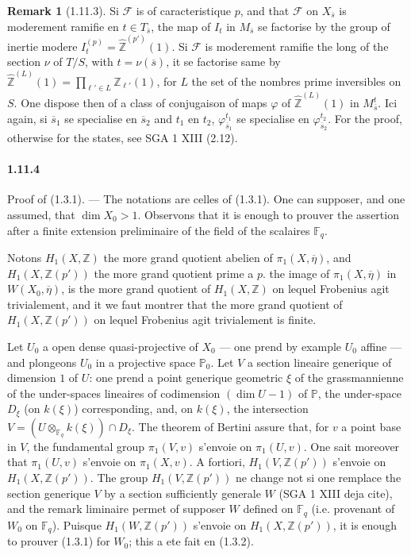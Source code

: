 \documentclass[12pt,a4paper]{article}
\theoremstyle{plain}
\theoremstyle{definition}
\newtheorem{remark}[theorem]{Remark}
\theoremstyle{remark}
\newcommand{\FF}{{\mathbb{F}}}
\newcommand{\ZZ}{{\mathbb{Z}}}
\newcommand{\ZZhat}{{\widehat{\ZZ}}}
\newcommand{\PP}{{\mathbb{P}}}
\begin{document}
\begin{remark}[1.11.3]
Si $\mathscr{F}$ is of caracteristique $p$, and that $\mathscr{F}$ on $X_{\overline{s}}$ is moderement ramifie en $t \in T_{\overline{s}}$, the map of $I_t$ in $M_{\overline{s}}$ se factorise by the group of inertie modere $I_t^{(p)} = \ZZhat^{(p')}(1)$. Si $\mathscr{F}$ is moderement ramifie the long of the section $\nu$ of $T/S$, with $t = \nu(\overline{s})$, it se factorise same by $\ZZhat^{(L)}(1) = \prod_{\ell' \in L} \ZZ_{\ell'}(1)$, for $L$ the set of the nombres prime inversibles on $S$. One dispose then of a class of conjugaison of maps $\varphi$ of $\ZZhat^{(L)}(1)$ in $M_{\overline{s}}^t$. Ici again, si $\overline{s}_1$ se specialise en $\overline{s}_2$ and $t_1$ en $t_2$, $\varphi_{\overline{s}_1}^{t_1}$ se specialise en $\varphi_{\overline{s}_2}^{t_2}$. For the proof, otherwise for the states, see SGA 1 XIII (2.12).
\end{remark}

\paragraph{1.11.4}
Proof of (1.3.1). --- The notations are celles of (1.3.1). One can supposer, and one assumed, that $\dim X_0 > 1$. Observons that it is enough to prouver the assertion after a finite extension preliminaire of the field of the scalaires $\FF_q$.

Notons $H_1(X, \ZZ)$ the more grand quotient abelien of $\pi_1(X, \overline{\eta})$, and $H_1(X, \ZZ(p'))$ the more grand quotient prime a $p$. the image of $\pi_1(X, \overline{\eta})$ in $W(X_0, \overline{\eta})$, is the more grand quotient of $H_1(X, \ZZ)$ on lequel Frobenius agit trivialement, and it we faut montrer that the more grand quotient of $H_1(X, \ZZ(p'))$ on lequel Frobenius agit trivialement is finite.

Let $U_0$ a open dense quasi-projective of $X_0$ --- one prend by example $U_0$ affine --- and plongeons $U_0$ in a projective space $\PP_0$. Let $V$ a section lineaire generique of dimension $1$ of $U$: one prend a point generique geometric $\xi$ of the grassmannienne of the under-spaces lineaires of codimension $(\dim U - 1)$ of $\PP$, the under-space $D_\xi$ (on $k(\xi)$) corresponding, and, on $k(\xi)$, the intersection $V = (U \otimes_{\FF_q} k(\xi)) \cap D_\xi$. The theorem of Bertini assure that, for $v$ a point base in $V$, the fundamental group $\pi_1(V, v)$ s'envoie on $\pi_1(U, v)$. One sait moreover that $\pi_1(U, v)$ s'envoie on $\pi_1(X, v)$. A fortiori, $H_1(V, \ZZ(p'))$ s'envoie on $H_1(X, \ZZ(p'))$. The group $H_1(V, \ZZ(p'))$ ne change not si one remplace the section generique $V$ by a section sufficiently generale $W$ (SGA 1 XIII deja cite), and the remark liminaire permet of supposer $W$ defined on $\FF_q$ (i.e. provenant of $W_0$ on $\FF_q$). Puisque $H_1(W, \ZZ(p'))$ s'envoie on $H_1(X, \ZZ(p'))$, it is enough to prouver (1.3.1) for $W_0$; this a ete fait en (1.3.2).
\end{document}
